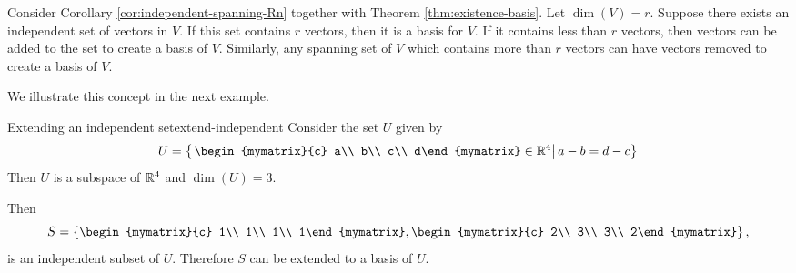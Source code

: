 Consider Corollary \ref{cor:independent-spanning-Rn} together with Theorem \ref{thm:existence-basis}. Let $\dim(V) = r$. Suppose there exists an independent set of vectors in $V$. If this set contains $r$ vectors, then it is a basis for $V$. If it contains less than $r$ vectors, then vectors can be added to the set to create a basis of $V$. Similarly, any spanning set of $V$ which contains more than $r$ vectors can have vectors removed to create a basis of $V$.

We illustrate this concept in the next example.

\begin{example}{Extending an independent set}{extend-independent}
Consider the set $U$ given by 
\[ U=\set{\left.\begin{mymatrix}{c} a\\ b\\ c\\ d\end{mymatrix}
\in\R^4 \right\vert a-b=d-c }\]
Then $U$ is a subspace of $\mathbb{R}^4$ and $\dim(U)=3$.

Then
\[S=\set{
\begin{mymatrix}{c} 1\\ 1\\ 1\\ 1\end{mymatrix},
\begin{mymatrix}{c} 2\\ 3\\ 3\\ 2\end{mymatrix} },\]
is an independent subset of $U$.
Therefore $S$ can be extended to a basis of $U$.
\end{example}

